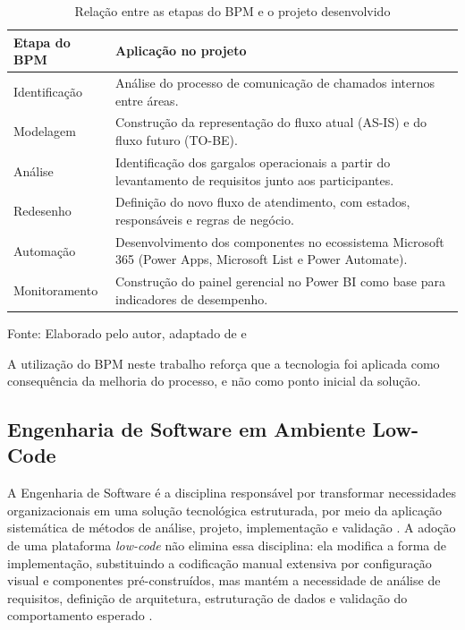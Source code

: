 \begin{table}[H]
\caption{Relação entre as etapas do BPM e o projeto desenvolvido}
\label{quadro:bpm-projeto}
\centering
\begin{tabular}{p{2.6cm} p{9.2cm}}
\hline
\textbf{Etapa do BPM} & \textbf{Aplicação no projeto} \\
\hline
Identificação & Análise do processo de comunicação de
chamados internos entre áreas. \\
\hline
Modelagem & Construção da representação do fluxo atual
(AS-IS) e do fluxo futuro (TO-BE). \\
\hline
Análise & Identificação dos gargalos operacionais a partir
do levantamento de requisitos junto aos participantes. \\
\hline
Redesenho & Definição do novo fluxo de atendimento, com
estados, responsáveis e regras de negócio. \\
\hline
Automação & Desenvolvimento dos componentes no ecossistema
Microsoft 365 (Power Apps, Microsoft List e Power
Automate). \\
\hline
Monitoramento & Construção do painel gerencial no Power BI
como base para indicadores de desempenho. \\
\hline
\end{tabular}
\raggedright
\par
{\fontsize{10}{12}\selectfont Fonte: Elaborado pelo autor,
adaptado de \cite{Ramos2024} e \cite{SantosCaldeiraPacheco2026}}
\end{table}

A utilização do BPM neste trabalho reforça que a tecnologia
foi aplicada como consequência da melhoria do processo, e
não como ponto inicial da solução.

\subsection{Engenharia de Software em Ambiente Low-Code}

A Engenharia de Software é a disciplina responsável por
transformar necessidades organizacionais em uma solução
tecnológica estruturada, por meio da aplicação sistemática de
métodos de análise, projeto, implementação e validação
\cite{Alves2022}. A adoção de uma plataforma \textit{low-code}
não elimina essa disciplina: ela modifica a forma de
implementação, substituindo a codificação manual extensiva
por configuração visual e componentes pré-construídos, mas
mantém a necessidade de análise de requisitos, definição de
arquitetura, estruturação de dados e validação do
comportamento esperado \cite{Mendes2024}.

